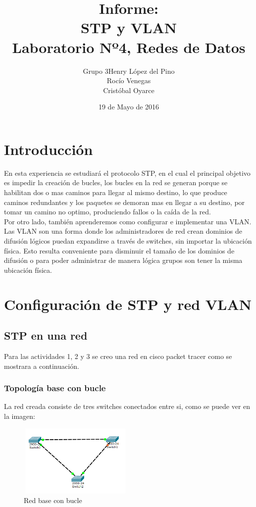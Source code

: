 \documentclass[spanish]{udpreport}
\title{Informe:\\ STP y VLAN\\Laboratorio Nº4, Redes de Datos}
\author{Grupo 3\linebreak \linebreak Henry López del Pino\\ Rocío Venegas\\ Cristóbal Oyarce}
\date{19 de Mayo de 2016}
\begin{document}
\maketitle

\tableofcontents

\chapter{Introducción}

En esta experiencia se estudiará el protocolo STP, en el cual el principal objetivo es impedir la creación de bucles, los bucles en la red se generan porque se habilitan dos o mas caminos para llegar al mismo destino, lo que produce caminos redundantes y los paquetes se demoran mas en llegar a su destino, por tomar un camino no optimo, produciendo fallos o la caída de la red. 
\\

Por otro lado, también aprenderemos como configurar e implementar una VLAN. Las VLAN  son una forma donde los administradores de red crean dominios de difusión lógicos  puedan expandirse a través de switches,  sin importar la ubicación física. Esto resulta conveniente para disminuir el tamaño de los dominios de difusión o para poder administrar de manera lógica grupos son tener la misma ubicación física.  

\chapter{Configuración de STP y red VLAN}

\section{STP en una red}

Para las actividades 1, 2 y 3 se creo una red en cisco packet tracer como se mostrara a continuación. 

\subsection{Topología base con bucle}

La red creada consiste de tres switches conectados entre si, como se puede ver en la imagen:
\begin{figure}[htb]
\centering
\includegraphics[width=5.5cm, height=3.5cm]{photos/red_original.png}
\caption{Red base con bucle} \label{fig:photos/red_original.png}
\end{figure}
\end{document}
